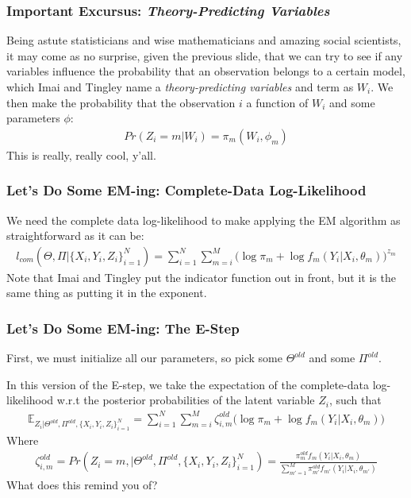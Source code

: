 \documentclass{beamer}
\begin{document}
\begin{frame}
\frametitle{Important Excursus: \textit{Theory-Predicting Variables}}
Being astute statisticians and wise mathematicians and amazing social scientists, it may come as no surprise, given the previous slide, that we can try to see if any variables influence the probability that an observation belongs to a certain model, which Imai and Tingley name a \textit{theory-predicting variables} and term as $W_i$. We then make the probability that the observation $i$ a function of $W_i$ and some parameters $\phi$:
\begin{align}
	Pr(Z_i=m|W_i) = \pi_m(W_i, \phi_m)
\end{align}
\color{red}
This is really, really cool, y'all.
\end{frame}

\begin{frame}
\frametitle{Let's Do Some EM-ing: Complete-Data Log-Likelihood}
We need the complete data log-likelihood to make applying the EM algorithm as straightforward as it can be:
\begin{align}
l_{com}(\Theta, \Pi|\{X_i, Y_i, Z_i\}^N_{i=1}) = \sum_{i=1}^{N}\sum_{m=i}^{M}\bigg(\log\pi_m + \log f_m(Y_i|X_i, \theta_m) \bigg)^{z_m}
\end{align}
Note that Imai and Tingley put the indicator function out in front, but it is the same thing as putting it in the exponent.
\end{frame}   

\begin{frame}
\frametitle{Let's Do Some EM-ing: The E-Step}
First, we must initialize all our parameters, so pick some $\Theta^{old}$ and some $\Pi^{old}$.

In this version of the E-step, we take the expectation of the complete-data log-likelihood w.r.t the posterior probabilities of the latent variable $Z_i$, such that
\begin{align}
	\mathbb{E}_{Z_i|\Theta^{old},\Pi^{old}, \{X_i, Y_i, Z_i\}^N_{i=1}} = 
	\sum_{i=1}^{N}\sum_{m=i}^{M} \zeta^{old}_{i,m} \bigg(\log\pi_m + \log f_m(Y_i|X_i, \theta_m) \bigg)
\end{align}
Where 
\begin{align}
	\zeta^{old}_{i,m} = Pr(Z_i = m, |\Theta^{old}, \Pi^{old}, \{X_i, Y_i, Z_i\}^N_{i=1}) = \frac{ \pi_m^{old} f_m(Y_i| X_i, \theta_m)}{\sum_{m' = 1}^{M} \pi_{m'}^{old} f_{m'}(Y_i| X_i, \theta_{m'})}
\end{align}
What does this remind you of?
\end{frame}
\end{document}
